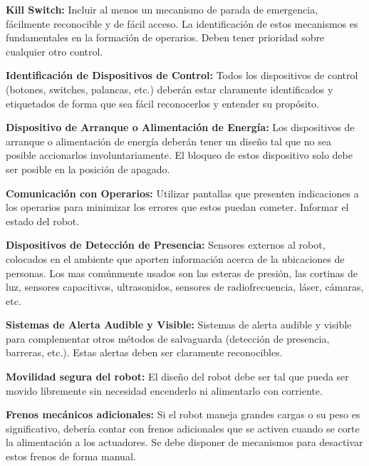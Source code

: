 \documentclass[withindex,glossary]{cam-thesis}
\begin{document}
\textbf{Kill Switch:} Incluir al menos un mecanismo de parada de emergencia, fácilmente reconocible y de fácil acceso. La identificación de estos mecanismos es fundamentales en la formación de operarios. Deben tener prioridad sobre cualquier otro control.

\textbf{Identificación de Dispositivos de Control:} Todos los dispositivos de control (botones, switches, palancas, etc.) deberán estar claramente identificados y etiquetados de forma que sea fácil reconocerlos y entender su propósito.

\textbf{Dispositivo de Arranque o Alimentación de Energía:} Los dispositivos de arranque o alimentación de energía deberán tener un diseño tal que no sea posible accionarlos involuntariamente. El bloqueo de estos dispositivo solo debe ser posible en la posición de apagado.

\textbf{Comunicación con Operarios:} Utilizar pantallas que presenten indicaciones a los operarios para minimizar los errores que estos puedan cometer. Informar el estado del robot.

\textbf{Dispositivos de Detección de Presencia:} Sensores externos al robot, colocados en el ambiente que aporten información acerca de la ubicaciones de personas. Los mas comúnmente usados son las esteras de presión, las cortinas de luz, sensores capacitivos, ultrasonidos, sensores de radiofrecuencia, láser, cámaras, etc.

\textbf{Sistemas de Alerta Audible y Visible:} Sistemas de alerta audible y visible para complementar otros métodos de salvaguarda (detección de presencia, barreras, etc.). Estas alertas deben ser claramente reconocibles.

\textbf{Movilidad segura del robot:} El diseño del robot debe ser tal que pueda ser movido libremente sin necesidad encenderlo ni alimentarlo con corriente.

\textbf{Frenos mecánicos adicionales:} Si el robot maneja grandes cargas o su peso es significativo, debería contar con frenos adicionales que se activen cuando se corte la alimentación a los actuadores. Se debe disponer de mecanismos para desactivar estos frenos de forma manual.
\end{document}
